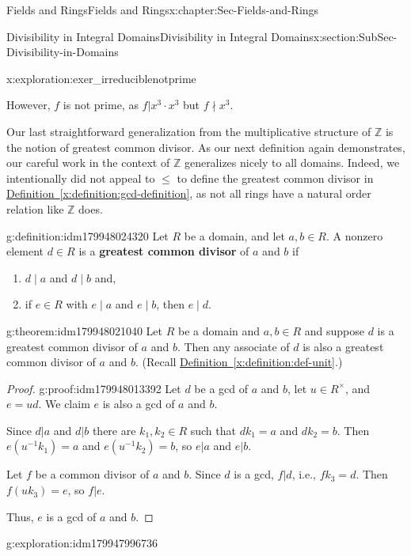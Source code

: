 \documentclass[oneside,10pt,]{book}
\newcommand{\xreffont}{\relax}
\newcommand{\terminology}[1]{\textbf{#1}}
\numberwithin{equation}{section}
\renewcommand{\le}{\leqslant}
\def\Z{{\mathbb Z}}
\begin{document}
\begin{chapterptx}{Fields and Rings}{}{Fields and Rings}{}{}{x:chapter:Sec-Fields-and-Rings}
\begin{sectionptx}{Divisibility in Integral Domains}{}{Divisibility in Integral Domains}{}{}{x:section:SubSec-Divisibility-in-Domains}
\begin{exploration}{}{x:exploration:exer_irreduciblenotprime}
\par
However, \(f\) is not prime, as \(f| x^3 \cdot x^3\) but \(f\nmid x^3\).%
\end{exploration}
Our last straightforward generalization from the multiplicative structure of \(\Z\) is the notion of greatest common divisor. As our next definition again demonstrates, our careful work in the context of \(\Z\) generalizes nicely to all domains. Indeed, we intentionally did not appeal to \(\le\) to define the greatest common divisor in \hyperref[x:definition:gcd-definition]{Definition~{\xreffont\ref{x:definition:gcd-definition}}}, as not all rings have a natural order relation like \(\Z\) does.%
\begin{definition}{}{g:definition:idm179948024320}%
%
Let \(R\) be a domain, and let \(a,b\in R\). A nonzero element \(d\in R\) is a \terminology{greatest common divisor} of \(a\) and \(b\) if%
\begin{enumerate}
\item{}\(d\mid a\) and \(d\mid b\) and,%
\item{}if \(e\in R\) with \(e\mid a\) and \(e\mid b\), then \(e\mid d\).%
\end{enumerate}
%
\end{definition}
\begin{theorem}{}{}{g:theorem:idm179948021040}%
Let \(R\) be a domain and \(a,b\in R\) and suppose \(d\) is a greatest common divisor of \(a\) and \(b\). Then any associate of \(d\) is also a greatest common divisor of \(a\) and \(b\). (Recall \hyperref[x:definition:def-unit]{Definition~{\xreffont\ref{x:definition:def-unit}}}.)%
\end{theorem}
\begin{proof}{}{g:proof:idm179948013392}
Let \(d\) be a gcd of \(a\) and \(b\), let \(u\in R^\times\), and \(e =ud\). We claim \(e\) is also a gcd of \(a\) and \(b\).%
\par
Since \(d|a\) and \(d|b\) there are \(k_1,k_2\in R\) such that \(d k_1 = a\) and \(d k_2 = b\). Then \(e (u^{-1} k_1) = a\) and \(e (u^{-1} k_2) = b\), so \(e|a\) and \(e|b\).%
\par
Let \(f\) be a common divisor of \(a\) and \(b\). Since \(d\) is a gcd, \(f|d\), i.e., \(f k_3 = d\). Then \(f (uk_3) = e\), so \(f|e\).%
\par
Thus, \(e\) is a gcd of \(a\) and \(b\).%
\end{proof}
\begin{exploration}{}{g:exploration:idm179947996736}%

\end{exploration}
\end{sectionptx}
\end{chapterptx}
\end{document}
